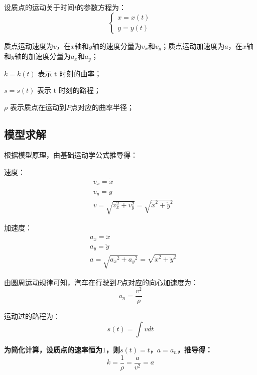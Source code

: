 \documentclass[withoutpreface,bwprint]{cumcmthesis}
\begin{document}
设质点的运动关于时间$t$的参数方程为：
\begin{equation}
\left\{\begin{array}{l}
x=x(t) \\
y=y(t)
\end{array}\right.
\end{equation}

质点运动速度为$v$，在$x$轴和$y$轴的速度分量为$v_x$和$v_y$；质点运动加速度为$a$，在$x$轴和$y$轴的加速度分量为$a_x$和$a_y$；

$k=k(t)$ 表示 $\mathrm{t}$ 时刻的曲率；

$s=s(t)$ 表示 $\mathrm{t}$ 时刻的路程；

$\rho$ 表示质点在运动到$P$点对应的曲率半径；

\subsection{模型求解}
根据模型原理，由基础运动学公式推导得：

速度：
\begin{equation}
\begin{aligned}
& v_x=\dot{x} \\
& v_y=\dot{y} \\
& v=\sqrt{v_x^2+v_y^2}=\sqrt{\dot{x}^2+\dot{y}^2}
\end{aligned}
\end{equation}

加速度：
\begin{equation}
\begin{aligned}
& a_x=\ddot{x} \\
& a_y=\ddot{y} \\
& a=\sqrt{a_x{ }^2+a_y{ }^2}=\sqrt{\ddot{x}^2+\ddot{y}^2}
\end{aligned}
\end{equation}

由圆周运动规律可知，汽车在行驶到$P$点对应的向心加速度为：
\begin{equation}
a_n=\frac{v^2}{\rho}
\end{equation}

运动过的路程为：
\begin{equation}
s(t)=\int v d t
\end{equation}

\textbf{为简化计算，设质点的速率恒为$1$，则$s(t)=t$，$a=a_n$，推导得：} 
\begin{equation}
k=\frac{1}{\rho}=\frac{a}{v^2}=a
\end{equation}
\end{document}
